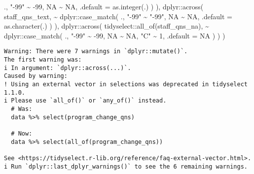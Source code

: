 \documentclass[
  letterpaper,
  DIV=11,
  numbers=noendperiod]{scrreprt}
\newenvironment{Shaded}{\begin{snugshade}}{\end{snugshade}}
\newcommand{\AttributeTok}[1]{\textcolor[rgb]{0.40,0.45,0.13}{#1}}
\newcommand{\CommentTok}[1]{\textcolor[rgb]{0.37,0.37,0.37}{#1}}
\newcommand{\ConstantTok}[1]{\textcolor[rgb]{0.56,0.35,0.01}{#1}}
\newcommand{\DecValTok}[1]{\textcolor[rgb]{0.68,0.00,0.00}{#1}}
\newcommand{\FunctionTok}[1]{\textcolor[rgb]{0.28,0.35,0.67}{#1}}
\newcommand{\NormalTok}[1]{\textcolor[rgb]{0.00,0.23,0.31}{#1}}
\newcommand{\SpecialCharTok}[1]{\textcolor[rgb]{0.37,0.37,0.37}{#1}}
\newcommand{\StringTok}[1]{\textcolor[rgb]{0.13,0.47,0.30}{#1}}
\begin{document}
\begin{Shaded}
\begin{Highlighting}[]
\NormalTok{        .,}
        \StringTok{"{-}99"} \SpecialCharTok{\textasciitilde{}} \SpecialCharTok{{-}}\DecValTok{99}\NormalTok{, }\ConstantTok{NA} \SpecialCharTok{\textasciitilde{}} \ConstantTok{NA}\NormalTok{,}
        \AttributeTok{.default =} \FunctionTok{as.integer}\NormalTok{(.)}
\NormalTok{      )}
\NormalTok{    ),}
\NormalTok{    dplyr}\SpecialCharTok{::}\FunctionTok{across}\NormalTok{(}
\NormalTok{      staff\_qns\_text,}
      \SpecialCharTok{\textasciitilde{}}\NormalTok{ dplyr}\SpecialCharTok{::}\FunctionTok{case\_match}\NormalTok{(}
\NormalTok{        .,}
        \StringTok{"{-}99"} \SpecialCharTok{\textasciitilde{}} \StringTok{"{-}99"}\NormalTok{, }\ConstantTok{NA} \SpecialCharTok{\textasciitilde{}} \ConstantTok{NA}\NormalTok{,}
        \AttributeTok{.default =} \FunctionTok{as.character}\NormalTok{(.)}
\NormalTok{      )}
\NormalTok{    ),}
\NormalTok{    dplyr}\SpecialCharTok{::}\FunctionTok{across}\NormalTok{(}
\NormalTok{      tidyselect}\SpecialCharTok{::}\FunctionTok{all\_of}\NormalTok{(staff\_qns\_na),}
      \SpecialCharTok{\textasciitilde{}}\NormalTok{ dplyr}\SpecialCharTok{::}\FunctionTok{case\_match}\NormalTok{(}
\NormalTok{        .,}
        \StringTok{"{-}99"} \SpecialCharTok{\textasciitilde{}} \SpecialCharTok{{-}}\DecValTok{99}\NormalTok{, }\ConstantTok{NA} \SpecialCharTok{\textasciitilde{}} \ConstantTok{NA}\NormalTok{, }\StringTok{"C"} \SpecialCharTok{\textasciitilde{}} \DecValTok{1}\NormalTok{,}
        \AttributeTok{.default =} \ConstantTok{NA}
\NormalTok{      )}
\NormalTok{    )}
\NormalTok{  )}
\end{Highlighting}
\end{Shaded}

\begin{verbatim}
Warning: There were 7 warnings in `dplyr::mutate()`.
The first warning was:
i In argument: `dplyr::across(...)`.
Caused by warning:
! Using an external vector in selections was deprecated in tidyselect 1.1.0.
i Please use `all_of()` or `any_of()` instead.
  # Was:
  data %>% select(program_change_qns)

  # Now:
  data %>% select(all_of(program_change_qns))

See <https://tidyselect.r-lib.org/reference/faq-external-vector.html>.
i Run `dplyr::last_dplyr_warnings()` to see the 6 remaining warnings.
\end{verbatim}

\begin{Shaded}
\end{Shaded}
\end{document}
